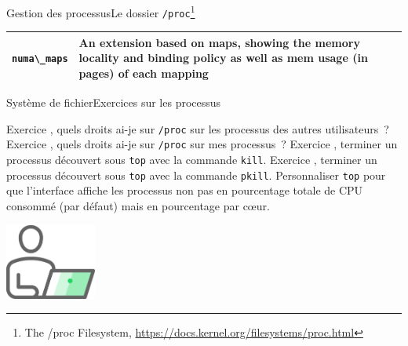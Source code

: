 \documentclass{beamer}
\begin{document}
\begin{frame}{Gestion des processus}{Le dossier \lstinline{/proc}\footnote{The /proc Filesystem, \url{https://docs.kernel.org/filesystems/proc.html}}}
\begin{footnotesize}
\begin{tiny}
\begin{table}[h!]
\begin{tabular}{|p{2cm}|p{8cm}|}
                        \hline
                        \lstinline{numa\_maps}    & An extension based on maps, showing the memory locality and binding policy as well as mem usage (in pages) of each mapping      \\
                        \hline
                    \end{tabular}
                \end{table}
            \end{tiny}
        \end{footnotesize}
    \end{frame}

    \begin{frame}{Système de fichier}{Exercices sur les processus}
        \begin{small}
            Exercice \execcounterdispinc{}, quels droits ai-je sur \lstinline{/proc} sur les processus des autres utilisateurs~?
            \bigbreak
            Exercice \execcounterdispinc{}, quels droits ai-je sur \lstinline{/proc} sur mes processus~?
            \bigbreak
            Exercice \execcounterdispinc{}, terminer un processus découvert sous \lstinline{top} avec la commande \lstinline{kill}.
            \bigbreak
            Exercice \execcounterdispinc{}, terminer un processus découvert sous \lstinline{top} avec la commande \lstinline{pkill}.
            \bigbreak
            Personnaliser \lstinline{top} pour que l'interface affiche les processus non pas en pourcentage totale de CPU consommé (par défaut) mais en pourcentage par cœur.
        \end{small}
        \begin{center}
            \includegraphics[width=3cm]{image/guy-in-front-of-desktop}
        \end{center}
    \end{frame}
\end{document}
